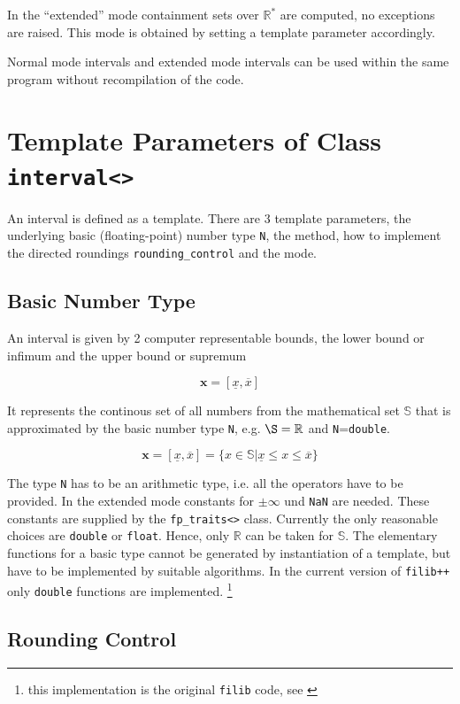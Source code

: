 \documentclass{report}
\newcommand{\Rs}{\mathbb{R}^*}
\newcommand{\R}{\mathbb{R}}
\newcommand{\xx}{\mathbf{x}}
\begin{document}
In the ``extended'' mode containment sets over $\Rs$ are computed, no
exceptions are raised. This mode is obtained by setting a template parameter
accordingly.

Normal mode intervals and extended mode intervals can be used within the same
program without recompilation of the code.
		
		\section{Template Parameters of Class
		\texttt{interval<>}} \label{template}
An interval is defined as a template.
There are 3 template parameters, the underlying basic
		(floating-point) number type
		\texttt{N}, the method, how to implement the directed
		roundings \texttt{rounding\_control} and the mode.

		\subsection{Basic Number Type}
		\label{Zahlentyp}

An interval is given by 2 computer representable bounds, the lower
bound or infimum and the upper bound or supremum 

\[ \xx = [\underline{x},\overline{x}] \]

It represents the continous set of all numbers from the mathematical
set $\mathbb{S}$ that is approximated by the basic number type
\texttt{N}, e.g. $\S=\R$ and \texttt{N}=\texttt{double}.

\[ \xx = [\underline{x},\overline{x}] = \{x \in \mathbb{S}
|\underline{x} \leq x \leq \overline{x} \} \]

The type \texttt{N} has to be an arithmetic type, i.e. all the
operators have to be provided. In the extended mode constants for
 $\pm\infty$ und \texttt{NaN} are needed. These constants are supplied
 by the \texttt{fp\_traits<>} class.
Currently the only reasonable choices are  \texttt{double} or
\texttt{float}. Hence,  only $\mathbb{R}$ can be taken for $\mathbb{S}$. 
The elementary functions for a basic type  cannot be
generated by instantiation of a template, but have to be implemented
by suitable algorithms. In the current version of \texttt{filib++} only
\texttt{double} functions are implemented. \footnote{this
implementation is the original \texttt{filib} code, see \cite{filib}}



		\subsection{Rounding Control}
		\label{Rundungskontrolle}
\end{document}
